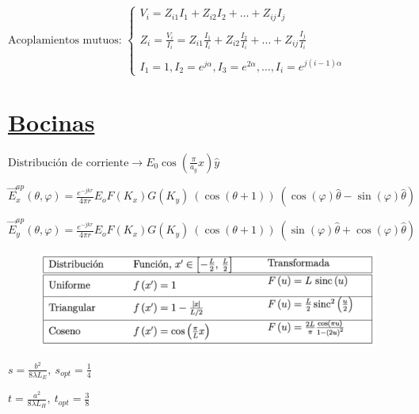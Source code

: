 \documentclass[twocolumn, 8pt]{extarticle}
\begin{document}
\vspace{0.5cm}
\( \text{Acoplamientos mutuos: } \left \{
\begin{array}{l}
	V_i = Z_{i1}I_1 + Z_{i2}I_2 + \dots + Z_{ij}I_j                                                          \\ \\
	Z_i = \frac{V_i}{I_i} = Z_{i1} \frac{I_1}{I_i} + Z_{i2} \frac{I_2}{I_i} + \dots + Z_{ij} \frac{I_j}{I_i} \\ \\
	I_1 = 1, I_2 = e^{j\alpha}, I_3 = e^{2\alpha}, \dots, I_i = e^{j(i-1)\alpha}
\end{array}
\right .
\)

\vspace{0.5cm}
\section*{\underline{Bocinas}}

\( \text{Distribución de corriente} \rightarrow E_0 \cos \left( \frac{\pi}{a_g}x \right) \hat{y} \)

\vspace{0.5cm}
\( \vec{E}_x^{ap}(\theta, \varphi) = \frac{e^{-jkr}}{4\pi r} E_o F(K_x) G(K_y)\ (\cos(\theta + 1))\ (\cos(\varphi) \hat{\theta} -  \sin(\varphi)\hat{\theta}) \)

\vspace{0.5cm}
\( \vec{E}_y^{ap}(\theta, \varphi) = \frac{e^{-jkr}}{4\pi r} E_o F(K_x) G(K_y)\ (\cos(\theta + 1))\ (\sin(\varphi) \hat{\theta} +  \cos(\varphi)\hat{\theta}) \)

\begin{figure}[H]
	\centering
	\includegraphics[width=\columnwidth]{distribuciones.png}
\end{figure}

\vspace{0.5cm}
\( s = \frac{ b^2 }{ 8\lambda L_E}, \ s_{opt} = \frac{1}{4} \)

\vspace{0.5cm}
\( t = \frac{ a^2 }{ 8\lambda L_H}, \ t_{opt} = \frac{3}{8} \)
\end{document}
